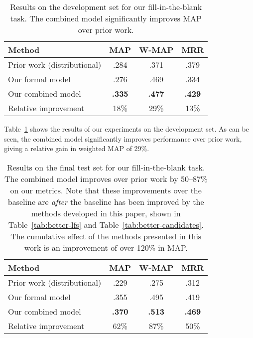 \documentclass[11pt]{article}
\newcommand{\tabref}[1]{Table~\ref{tab:#1}}
\begin{document}
\begin{table}
  \centering
  {\small
    \begin{tabular}{lccc}
      \toprule
      Method & MAP & W-MAP & MRR \\
      \midrule
      Prior work (distributional) & .284 & .371 & .379 \\
      \midrule
      Our formal model & .276 & .469 & .334 \\
      \midrule
      Our combined model & \textbf{.335} & \textbf{.477} & \textbf{.429} \\
      \midrule
      \midrule
      Relative improvement & 18\% & 29\% & 13\% \\
      \bottomrule
    \end{tabular}
  }
  \caption{Results on the development set for our fill-in-the-blank task.  The
  combined model significantly improves MAP over prior work.}
  \label{tab:dev-results}
\end{table}

\tabref{dev-results} shows the results of our experiments on the
development set.  As can be seen, the combined model significantly
improves performance over prior work, giving a relative gain in
weighted MAP of 29\%.

\begin{table}
  \centering
  {\small
    \begin{tabular}{lccc}
      \toprule
      Method & MAP & W-MAP & MRR \\
      \midrule
      Prior work (distributional) & .229 & .275 & .312 \\
      \midrule
      Our formal model & .355 & .495 & .419 \\
      \midrule
      Our combined model & \textbf{.370} & \textbf{.513} & \textbf{.469} \\
      \midrule
      \midrule
      Relative improvement & 62\% & 87\% & 50\% \\
      \bottomrule
    \end{tabular}
  }
  \caption{Results on the final test set for our fill-in-the-blank
  task.  The combined model improves over prior work by 50--87\% on
  our metrics.  Note that these improvements over the baseline are
  \emph{after} the baseline has been improved by the methods developed
  in this paper, shown in \tabref{better-lfs} and
  \tabref{better-candidates}.  The cumulative effect of the methods
  presented in this work is an improvement of over 120\% in MAP.}
  \label{tab:final-results}
\end{table}
\end{document}
